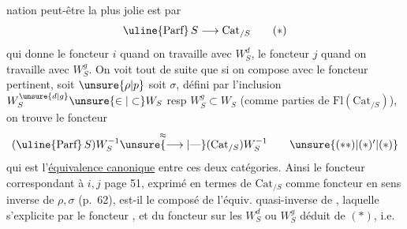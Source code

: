 %
nation peut-être la plus jolie est par
\[
 \text{\uline{Parf}}\,S\longrightarrow\mathrm{Cat}_{/S}
 \tag*{$(*)$}
\]
qui donne le foncteur $i$ quand on travaille avec $W_S^d$, le foncteur $j$ quand on travaille avec $W_S^g$. On voit  tout de suite que si on compose avec le foncteur pertinent, soit $\unsure{\rho|p}$ soit $\sigma$, défini par l'inclusion $W_S^{\unsure{d|g}}\unsure{\in|\subset}W_S$ resp $W_S^g\subset W_S$ (comme parties de $\mathrm{Fl}(\mathrm{Cat}_{/S})$), on trouve le foncteur 
\[
 (\text{\uline{Parf}}\,S)W_S^{-1}\overset{\approx}{\unsure{\longrightarrow|\text{---}}}(\mathrm{Cat}_{/S})W_S^{-1}
 \tag*{$\unsure{(**)|(*)'|(*)}$}
\]
qui est l'\uline{équivalence canonique} entre ces deux catégories. Ainsi le  foncteur correspondant à $i,j$ page 51, exprimé en termes de $\mathrm{Cat}_{/S}$ comme foncteur en sens inverse de $\rho,\sigma$ (p.~62), est-il le composé de l'équiv. quasi-inverse de \unsure{$(**)$}, laquelle s'explicite par le foncteur , et du foncteur sur les  $W_S^d$ ou $W_S^g$ déduit de $(*)$, i.e.
